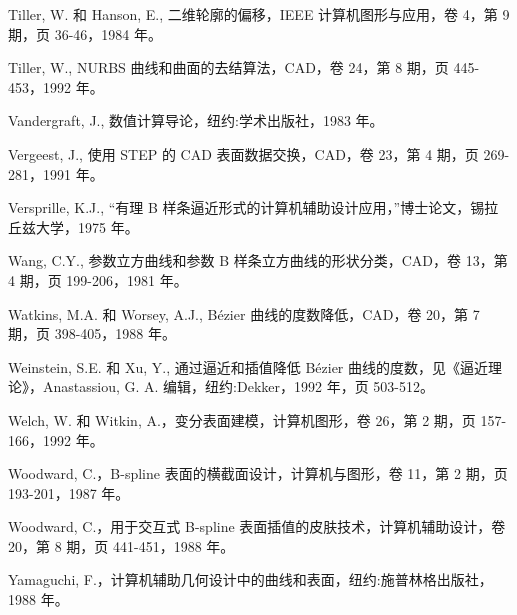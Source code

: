 \documentclass[../main.tex]{subfiles}
\begin{document}
\begin{BookBibliography}
 Tiller, W. 和 Hanson, E., 二维轮廓的偏移，IEEE 计算机图形与应用，卷 4，第 9 期，页 36-46，1984 年。

 Tiller, W., NURBS 曲线和曲面的去结算法，CAD，卷 24，第 8 期，页 445-453，1992 年。

 Vandergraft, J., 数值计算导论，纽约:学术出版社，1983 年。

 Vergeest, J., 使用 STEP 的 CAD 表面数据交换，CAD，卷 23，第 4 期，页 269-281，1991 年。

 Versprille, K.J., “有理 B 样条逼近形式的计算机辅助设计应用，”博士论文，锡拉丘兹大学，1975 年。

 Wang, C.Y., 参数立方曲线和参数 B 样条立方曲线的形状分类，CAD，卷 13，第 4 期，页 199-206，1981 年。

 Watkins, M.A. 和 Worsey, A.J., Bézier 曲线的度数降低，CAD，卷 20，第 7 期，页 398-405，1988 年。

 Weinstein, S.E. 和 Xu, Y., 通过逼近和插值降低 Bézier 曲线的度数，见《逼近理论》，Anastassiou, G. A. 编辑，纽约:Dekker，1992 年，页 503-512。

 Welch, W. 和 Witkin, A.，变分表面建模，计算机图形，卷 26，第 2 期，页 157-166，1992 年。

 Woodward, C.，B-spline 表面的横截面设计，计算机与图形，卷 11，第 2 期，页 193-201，1987 年。

 Woodward, C.，用于交互式 B-spline 表面插值的皮肤技术，计算机辅助设计，卷 20，第 8 期，页 441-451，1988 年。

 Yamaguchi, F.，计算机辅助几何设计中的曲线和表面，纽约:施普林格出版社，1988 年。

\end{BookBibliography}
\end{document}

